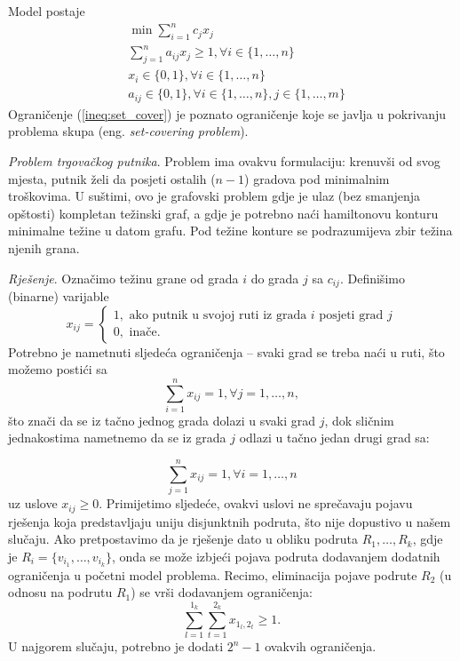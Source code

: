 \documentclass[a4paper, utf8, 11pt, colorlinks]{article}
\begin{document}
Model postaje 
\begin{align}
    &\min \sum_{i=1}^n c_j x_j \nonumber\\
    & \sum_{j=1}^n a_{ij} x_j \geq 1, \forall i \in \{1,\ldots, n\} \label{ineq:set_cover} \\
    & x_i \in \{0, 1 \}, \forall i \in \{1, \ldots, n\} \\
    & a_{ij} \in \{0, 1\}, \forall i \in \{1, \ldots, n\}, j \in\{1,\ldots, m\} \nonumber
\end{align}
Ograničenje (\ref{ineq:set_cover}) je poznato ograničenje koje se javlja u pokrivanju problema skupa (eng. \emph{set-covering problem}).

\emph{Problem trgovačkog putnika}. Problem ima ovakvu formulaciju: krenuvši od svog mjesta, putnik želi da posjeti ostalih ($n-1$) gradova pod minimalnim troškovima. U suštimi, ovo je grafovski problem gdje je ulaz (bez smanjenja opštosti) kompletan težinski graf, a gdje je potrebno naći hamiltonovu konturu minimalne težine u datom grafu. Pod težine konture se podrazumijeva zbir težina njenih grana. 

\emph{Rješenje}. Označimo težinu grane od grada $i$ do grada $j$ sa $c_{ij}$.  Definišimo (binarne) varijable 
$$x_{ij} = \begin{cases}
                1, \mbox{ ako putnik u svojoj ruti iz grada } i \mbox{ posjeti grad } j \\
                0, \mbox{ inače}. 
          \end{cases}$$ 
Potrebno je nametnuti sljedeća ograničenja -- svaki grad se treba naći u ruti,  što možemo postići sa 
$$  \sum_{i=1}^n x_{ij} = 1, \forall j =1,\ldots, n,$$ 
što znači da se iz tačno jednog grada dolazi u svaki grad $j$, dok sličnim jednakostima nametnemo da se iz grada $j$ odlazi u tačno jedan drugi grad sa:

$$  \sum_{j=1}^n x_{ij} = 1, \forall i =1,\ldots, n$$ 
 uz uslove $x_{ij}\geq 0$. Primijetimo sljedeće, ovakvi uslovi ne sprečavaju pojavu rješenja koja predstavljaju uniju disjunktnih podruta, što nije dopustivo u našem slučaju. Ako pretpostavimo da je rješenje dato u obliku podruta $R_1, \ldots, R_k$, gdje je $R_i = \{ v_{i_1}, \ldots, v_{i_k} \}$, onda se može izbjeći pojava podruta dodavanjem dodatnih ograničenja u početni model problema. Recimo, eliminacija pojave podrute $R_2$ (u odnosu na podrutu $R_1$) se vrši dodavanjem ograničenja:
 $$ \sum_{l=1}^{1_k}\sum_{t=1}^{2_k} x_{1_l, 2_t} \geq 1.$$
 U najgorem slučaju, potrebno je dodati $2^n-1$ ovakvih ograničenja. 
 
\end{document}
